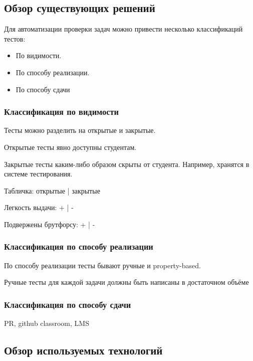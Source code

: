 
\subsection{Обзор существующих решений}

Для автоматизации проверки задач можно привести несколько классификаций тестов:
\begin{itemize}
    \item По видимости.
    \item По способу реализации.
    \item По способу сдачи
\end{itemize}

\subsubsection{Классификация по видимости}
Тесты можно разделить на открытые и закрытые.

Открытые тесты явно доступны студентам.

Закрытые тесты каким-либо образом скрыты от студента.
Например, хранятся в системе тестирования.

Табличка: открытые | закрытые

Легкость выдачи: + | -

Подвержены брутфорсу: + | -


\subsubsection{Классификация по способу реализации}
По способу реализации тесты бывают ручные и property-based.

Ручные тесты для каждой задачи должны быть написаны в достаточном объёме

\subsubsection{Классификация по способу сдачи}
PR, github classroom, LMS

\subsection{Обзор используемых технологий}

